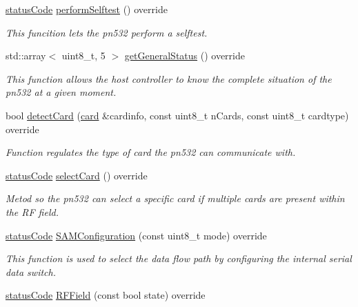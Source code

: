 \begin{DoxyCompactItemize}
\hyperlink{declarations_8h_ae1d20c5a38cae82ccaa6a77be3fd264b}{status\+Code} \hyperlink{classnfc_1_1PN532__chip_af47e591d52986e2241b80f1581af34ab}{perform\+Selftest} () override
\begin{DoxyCompactList}\small\item\em This funcition lets the pn532 perform a selftest. \end{DoxyCompactList}\item 
std\+::array$<$ uint8\+\_\+t, 5 $>$ \hyperlink{classnfc_1_1PN532__chip_a9ffef9f3b2982346499703361c6e7d5c}{get\+General\+Status} () override
\begin{DoxyCompactList}\small\item\em This function allows the host controller to know the complete situation of the pn532 at a given moment. \end{DoxyCompactList}\item 
bool \hyperlink{classnfc_1_1PN532__chip_a35a81a5e67025f6c04e472e3bd9e508c}{detect\+Card} (\hyperlink{classcard}{card} \&cardinfo, const uint8\+\_\+t n\+Cards, const uint8\+\_\+t cardtype) override
\begin{DoxyCompactList}\small\item\em Function regulates the type of card the pn532 can communicate with. \end{DoxyCompactList}\item 
\hyperlink{declarations_8h_ae1d20c5a38cae82ccaa6a77be3fd264b}{status\+Code} \hyperlink{classnfc_1_1PN532__chip_a348f7d8d7cf3853e47307efe5f787f34}{select\+Card} () override
\begin{DoxyCompactList}\small\item\em Metod so the pn532 can select a specific card if multiple cards are present within the RF field. \end{DoxyCompactList}\item 
\hyperlink{declarations_8h_ae1d20c5a38cae82ccaa6a77be3fd264b}{status\+Code} \hyperlink{classnfc_1_1PN532__chip_a8c8bdeb6af78024e6fb2ab119575843a}{S\+A\+M\+Configuration} (const uint8\+\_\+t mode) override
\begin{DoxyCompactList}\small\item\em This function is used to select the data flow path by configuring the internal serial data switch. \end{DoxyCompactList}\item 
\hyperlink{declarations_8h_ae1d20c5a38cae82ccaa6a77be3fd264b}{status\+Code} \hyperlink{classnfc_1_1PN532__chip_a23d21f68ecf6ea7c8a134436b94943b9}{R\+F\+Field} (const bool state) override

\end{DoxyCompactItemize}
